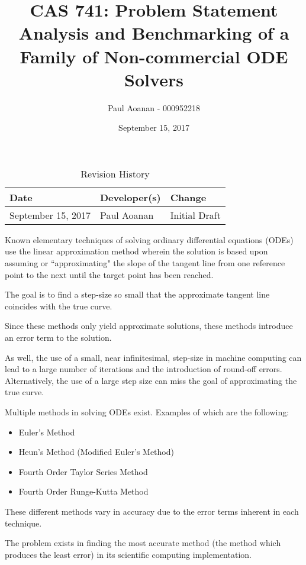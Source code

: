 \documentclass{article}
\title{CAS 741: Problem Statement\\Analysis and Benchmarking of a Family of Non-commercial ODE Solvers}
\author{Paul Aoanan - 000952218}
\date{September 15, 2017}
\begin{document}
\maketitle

\begin{table}[hp]
\caption{Revision History} \label{TblRevisionHistory}
\begin{tabularx}{\textwidth}{llX}
\toprule
\textbf{Date} & \textbf{Developer(s)} & \textbf{Change}\\
\midrule
September 15, 2017 & Paul Aoanan & Initial Draft\\
\bottomrule
\end{tabularx}
\end{table}

Known elementary techniques of solving ordinary differential equations (ODEs) use the linear
approximation method wherein the solution is based upon assuming or ``approximating" the slope
of the tangent line from one reference point to the next until the target point has been
reached.

The goal is to find a step-size so small that the approximate tangent line coincides
with the true curve.

Since these methods only yield approximate solutions, these methods introduce an error term to
the solution.

As well, the use of a small, near infinitesimal, step-size in machine computing can lead to a
large number of iterations and the introduction of round-off errors. Alternatively, the use of a
large step size can miss the goal of approximating the true curve.

Multiple methods in solving ODEs exist.
Examples of which are the following:
\begin{itemize}
	\item Euler's Method
	\item Heun's Method (Modified Euler's Method)
	\item Fourth Order Taylor Series Method
	\item Fourth Order Runge-Kutta Method
\end{itemize}

These different methods vary in accuracy due to the error terms inherent in each technique.

The problem exists in finding the most accurate method (the method which produces the least error) in its scientific computing implementation.




\end{document}
